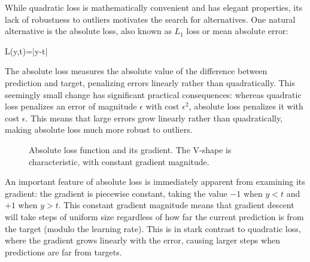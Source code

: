 While quadratic loss is mathematically convenient and has elegant properties, its lack of robustness to outliers motivates the search for alternatives. One natural alternative is the \alert{absolute loss}, also known as $L_1$ loss or mean absolute error:
\begin{myequation}
L(y,t)=|y-t|
\end{myequation}

The absolute loss measures the absolute value of the difference between prediction and target, penalizing errors linearly rather than quadratically. This seemingly small change has significant practical consequences: whereas quadratic loss penalizes an error of magnitude $\epsilon$ with cost $\epsilon^2$, absolute loss penalizes it with cost $\epsilon$. This means that large errors grow linearly rather than quadratically, making absolute loss much more robust to outliers.

\begin{figure}[ht]
\begin{center}
\end{center}
\caption{Absolute loss function and its gradient. The V-shape is characteristic, with constant gradient magnitude.}
\end{figure}

An important feature of absolute loss is immediately apparent from examining its gradient: the gradient is piecewise constant, taking the value $-1$ when $y < t$ and $+1$ when $y > t$. This constant gradient magnitude means that gradient descent will take steps of uniform size regardless of how far the current prediction is from the target (modulo the learning rate). This is in stark contrast to quadratic loss, where the gradient grows linearly with the error, causing larger steps when predictions are far from targets.

